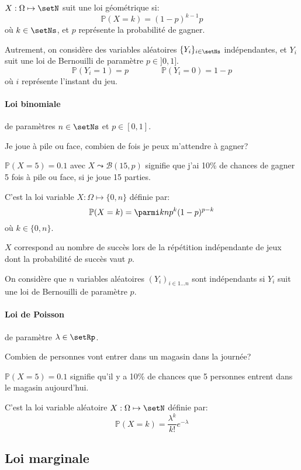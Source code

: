 \documentclass[a4paper,10pt,french,openany]{memoir}
\newcommand{\Proba}{\mathbb{P}}
\newcommand{\binomiale}{\mathcal{B}}
\begin{document}
$X:\Omega \mapsto \setN$ suit une loi géométrique si:
\[ \Proba(X=k)=(1-p)^{k-1}p \]
où $k \in \setNs$, et $p$ représente la probabilité de gagner.

Autrement, on considère des variables aléatoires $\{Y_i\}_{i\in \setNs}$ indépendantes, et $Y_i$ suit une loi de Bernouilli de paramètre $p\in ]0,1]$.
\[ \Proba(Y_i = 1) = p \qquad\qquad \Proba(Y_i=0)=1-p \]
où $i$ représente l'instant du jeu.

\paragraph{Loi binomiale} de paramètres $n\in \setNs$ et $p\in [0,1]$.

\begin{cquote}{}
Je joue à pile ou face, combien de fois je peux m'attendre à gagner?

$\Proba(X=5)=0.1$ avec $X\leadsto\binomiale(15, p)$ signifie que j'ai 10\% de chances de gagner 5 fois à pile ou face, si je joue 15 parties.
\end{cquote}

C'est la loi variable $X:\Omega \mapsto \{0,n\}$ définie par: 
\[\Proba(X=k)=\parmi k n p^k (1-p)^{p-k}\]
où $k \in \{0,n\}$.

$X$ correspond au nombre de succès lors de la répétition indépendante de jeux dont la probabilité de succès vaut $p$.

On considère que $n$ variables aléatoires $(Y_i)_{i\in 1\dots n}$ sont indépendants si $Y_i$ suit une loi de Bernouilli de paramètre $p$.

\paragraph{Loi de Poisson} de paramètre $\lambda \in \setRp$.
\begin{cquote}{}
Combien de personnes vont entrer dans un magasin dans la journée?

$\Proba(X=5)=0.1$ signifie qu'il y a 10\% de chances que 5 personnes entrent dans le magasin aujourd'hui.
\end{cquote}

C'est la loi variable aléatoire $X: \Omega \mapsto \setN$ définie par:
\[\Proba(X=k)=\frac{\lambda^k}{k!} e^{-\lambda}\]

\subsection{Loi marginale}
\end{document}
